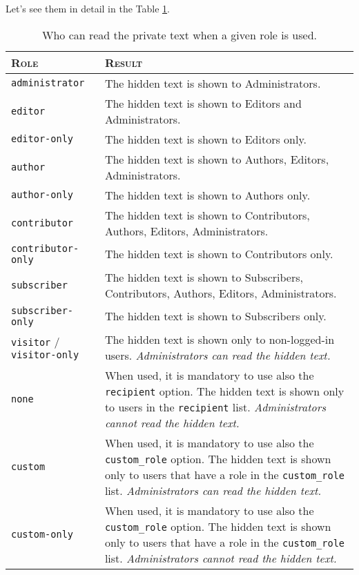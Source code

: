 \documentclass[
	titlepage,
	headinclude,
	abstract=on,
	paper=a4,
	fontsize=11pt,
]{scrartcl}
\begin{document}
Let's see them in detail in the Table \ref{table:roles}.

\begin{table}
 \centering
 \begin{tabular}[t]{l p{7cm}}
 \toprule
 \textsc{Role} & \textsc{Result} \\
 \midrule
 \verb+administrator+ & The hidden text is shown to Administrators. \\
 \verb+editor+ & The hidden text is shown to Editors and Administrators. \\
 \verb+editor-only+ & The hidden text is shown to Editors only. \\
 \verb+author+ & The hidden text is shown to Authors, Editors, Administrators. \\
 \verb+author-only+ & The hidden text is shown to Authors only. \\
 \verb+contributor+ & The hidden text is shown to Contributors, Authors, Editors, Administrators. \\
 \verb+contributor-only+ & The hidden text is shown to Contributors only. \\
 \verb+subscriber+ & The hidden text is shown to Subscribers, Contributors, Authors, Editors, Administrators. \\
 \verb+subscriber-only+ & The hidden text is shown to Subscribers only. \\
 \verb+visitor+ / \verb+visitor-only+ & The hidden text is shown only to non-logged-in users. \textit{Administrators can read the hidden text.} \\
 \verb+none+ & When used, it is mandatory to use also the \verb+recipient+ option. The hidden text is shown only to users in the \verb+recipient+ list. \textit{Administrators cannot read the hidden text.} \\
 \verb+custom+ & When used, it is mandatory to use also the \verb+custom_role+ option. The hidden text is shown only to users that have a role in the \verb+custom_role+ list. \textit{Administrators can read the hidden text.} \\
 \verb+custom-only+ & When used, it is mandatory to use also the \verb+custom_role+ option. The hidden text is shown only to users that have a role in the \verb+custom_role+ list. \textit{Administrators cannot read the hidden text.} \\
 \bottomrule
 \end{tabular}
 \caption{Who can read the private text when a given role is used.}
 \label{table:roles}
\end{table}
\end{document}
